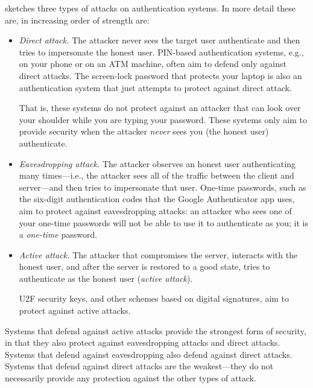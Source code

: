  sketches three types of attacks
on authentication systems. In more detail these
are, in increasing order of strength are:
\begin{itemize}
  \item \emph{Direct attack.} 
        The attacker never sees the target user authenticate and then tries
        to impersonate the honest user.
        PIN-based authentication systems, e.g., on your phone or on an ATM
        machine, often aim to defend only against direct attacks.
        The screen-lock password that protects your laptop is also an authentication system
        that just attempts to protect against direct attack.

        That is,
        these systems do not protect against an attacker that can look over your
        shoulder while you are typing your password. These systems only aim to provide
        security when the attacker \emph{never} sees you (the honest user) authenticate.


  \item \emph{Eavesdropping attack.} 
        The attacker observes an honest user authenticating many times---i.e.,
        the attacker sees all of the traffic between the client and server---and then
        tries to impersonate that user.
        One-time passwords, such as the six-digit authentication 
        codes that the Google Authenticator app uses, aim to protect against
        eavesdropping attacks: an attacker who sees one of your one-time passwords
        will not be able to use it to authenticate as you; it is a \emph{one-time} password.

  \item \emph{Active attack.} 
        The attacker that compromises the server, interacts with the honest user,
          and after the server is restored to a good state, tries to authenticate
        as the honest user (\emph{active attack}).

        U2F security keys, and other schemes based on digital
        signatures, aim to protect against active attacks.

\end{itemize}
Systems that defend against active attacks provide the strongest
form of security, in that they also protect against eavesdropping attacks
and direct attacks.
Systems that defend against eavesdropping also defend against direct
attacks.
Systems that defend against direct attacks are the weakest---they do not necessarily
provide any protection against the other types of attack.




